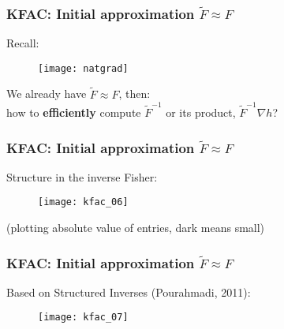 \begin{frame}
\frametitle{KFAC: Initial approximation $\tilde{F} \approx F$}
Recall:
\begin{figure}
    \raggedright
    \texttt{[image: natgrad]}
\end{figure}

We already have $\tilde{F} \approx F$, then: \\
how to \textbf{efficiently} compute $\tilde{F}^{-1}$ or its product, $\tilde{F}^{-1}\nabla h$?
\end{frame}

\begin{frame}
\frametitle{KFAC: Initial approximation $\tilde{F} \approx F$}
Structure in the inverse Fisher:
\begin{figure}
    \centering
    \texttt{[image: kfac\_06]}
\end{figure}
(plotting absolute value of entries, dark means small)
\end{frame}

\begin{frame}
\frametitle{KFAC: Initial approximation $\tilde{F} \approx F$}
Based on Structured Inverses (Pourahmadi, 2011):
\begin{figure}
    \raggedright
    \texttt{[image: kfac\_07]}
\end{figure}
\end{frame}
